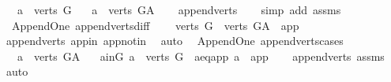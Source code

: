 \begin{isabellebody}
\ \ \ {\isachardoublequoteopen}a\ {\isasymin}\ verts\ G{\isachardoublequoteclose}\isanewline
\ \ \ {\isachardoublequoteopen}a\ {\isasymin}\ verts\ G{\isacharunderscore}{\kern0pt}A{\isachardoublequoteclose}\isanewline
%
\isadelimproof
\ \ %
\endisadelimproof
%
\isatagproof
{}\isamarkupfalse%
\ append{\isacharunderscore}{\kern0pt}verts\isanewline
\ \ \isamarkupfalse%
\ {\isacharparenleft}{\kern0pt}simp\ add{\isacharcolon}{\kern0pt}\ assms{\isacharparenright}{\kern0pt}%
\endisatagproof
{\isafoldproof}%
%
\isadelimproof
\ \isanewline
%
\endisadelimproof
\isanewline
{}\isamarkupfalse%
\ {\isacharparenleft}{\kern0pt}\ Append{\isacharunderscore}{\kern0pt}One{\isacharparenright}{\kern0pt}\ append{\isacharunderscore}{\kern0pt}verts{\isacharunderscore}{\kern0pt}diff{\isacharcolon}{\kern0pt}\ \isanewline
\ \ \ {\isachardoublequoteopen}verts\ G\ {\isacharequal}{\kern0pt}\ verts\ G{\isacharunderscore}{\kern0pt}A\ {\isacharminus}{\kern0pt}\ {\isacharbraceleft}{\kern0pt}app{\isacharbraceright}{\kern0pt}{\isachardoublequoteclose}\isanewline
%
\isadelimproof
\ \ %
\endisadelimproof
%
\isatagproof
{}\isamarkupfalse%
\ append{\isacharunderscore}{\kern0pt}verts\ app{\isacharunderscore}{\kern0pt}in\ app{\isacharunderscore}{\kern0pt}notin\ \isamarkupfalse%
\ auto%
\endisatagproof
{\isafoldproof}%
%
\isadelimproof
\isanewline
%
\endisadelimproof
\isanewline
{}\isamarkupfalse%
\ {\isacharparenleft}{\kern0pt}\ Append{\isacharunderscore}{\kern0pt}One{\isacharparenright}{\kern0pt}\ append{\isacharunderscore}{\kern0pt}verts{\isacharunderscore}{\kern0pt}cases{\isacharcolon}{\kern0pt}\ \isanewline
\ \ \ {\isachardoublequoteopen}a\ {\isasymin}\ verts\ G{\isacharunderscore}{\kern0pt}A{\isachardoublequoteclose}\isanewline
\ \ \ {\isacharparenleft}{\kern0pt}a{\isacharunderscore}{\kern0pt}in{\isacharunderscore}{\kern0pt}G{\isacharparenright}{\kern0pt}\ {\isachardoublequoteopen}a\ {\isasymin}\ verts\ G{\isachardoublequoteclose}\ {\isacharbar}{\kern0pt}\ {\isacharparenleft}{\kern0pt}a{\isacharunderscore}{\kern0pt}eq{\isacharunderscore}{\kern0pt}app{\isacharparenright}{\kern0pt}\ {\isachardoublequoteopen}a\ {\isacharequal}{\kern0pt}\ app{\isachardoublequoteclose}\isanewline
%
\isadelimproof
\ \ %
\endisadelimproof
%
\isatagproof
{}\isamarkupfalse%
\ append{\isacharunderscore}{\kern0pt}verts\ assms\ \isamarkupfalse%
\ auto%
\endisatagproof
{\isafoldproof}%

\end{isabellebody}
